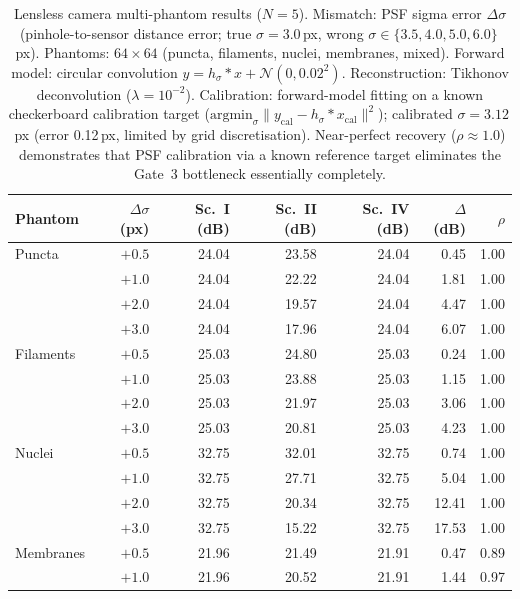 \documentclass[11pt]{article}
\theoremstyle{definition}
\begin{document}
\begin{table}[htbp]
\centering
\caption{Lensless camera multi-phantom results ($N{=}5$). Mismatch: PSF sigma error $\Delta\sigma$
(pinhole-to-sensor distance error; true $\sigma{=}3.0$\,px, wrong $\sigma \in \{3.5, 4.0, 5.0, 6.0\}$\,px).
Phantoms: $64{\times}64$ (puncta, filaments, nuclei, membranes, mixed).
Forward model: circular convolution $y{=}h_\sigma * x + \mathcal{N}(0, 0.02^2)$.
Reconstruction: Tikhonov deconvolution ($\lambda{=}10^{-2}$).
Calibration: forward-model fitting on a known checkerboard calibration target
($\mathrm{argmin}_{\sigma} \| y_\mathrm{cal} - h_\sigma * x_\mathrm{cal} \|^2$);
calibrated $\sigma{=}3.12$\,px (error 0.12\,px, limited by grid discretisation).
Near-perfect recovery ($\rho{\approx}1.0$) demonstrates that PSF calibration via a known reference target
eliminates the Gate~3 bottleneck essentially completely.}
\label{tab:lensless_scenes}
\small
\begin{tabular}{l r r r r r r}
\toprule
Phantom & $\Delta\sigma$ (px) & Sc.~I (dB) & Sc.~II (dB) & Sc.~IV (dB) & $\Delta$(dB) & $\rho$ \\
\midrule
Puncta       & $+0.5$ & 24.04 & 23.58 & 24.04 &  0.45 & 1.00 \\
             & $+1.0$ & 24.04 & 22.22 & 24.04 &  1.81 & 1.00 \\
             & $+2.0$ & 24.04 & 19.57 & 24.04 &  4.47 & 1.00 \\
             & $+3.0$ & 24.04 & 17.96 & 24.04 &  6.07 & 1.00 \\
Filaments    & $+0.5$ & 25.03 & 24.80 & 25.03 &  0.24 & 1.00 \\
             & $+1.0$ & 25.03 & 23.88 & 25.03 &  1.15 & 1.00 \\
             & $+2.0$ & 25.03 & 21.97 & 25.03 &  3.06 & 1.00 \\
             & $+3.0$ & 25.03 & 20.81 & 25.03 &  4.23 & 1.00 \\
Nuclei       & $+0.5$ & 32.75 & 32.01 & 32.75 &  0.74 & 1.00 \\
             & $+1.0$ & 32.75 & 27.71 & 32.75 &  5.04 & 1.00 \\
             & $+2.0$ & 32.75 & 20.34 & 32.75 & 12.41 & 1.00 \\
             & $+3.0$ & 32.75 & 15.22 & 32.75 & 17.53 & 1.00 \\
Membranes    & $+0.5$ & 21.96 & 21.49 & 21.91 &  0.47 & 0.89 \\
             & $+1.0$ & 21.96 & 20.52 & 21.91 &  1.44 & 0.97 \\

\end{tabular}
\end{table}
\end{document}
